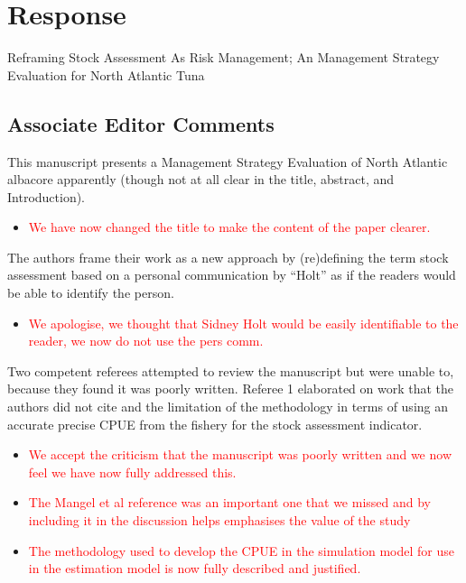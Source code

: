 \documentclass[a4paper,10pt]{article}
\newcommand{\red}{\textcolor{red}}
\begin{document}
\section*{Response}

Reframing Stock Assessment As Risk Management; An Management Strategy Evaluation for North Atlantic Tuna

\subsection*{Associate Editor Comments}

This manuscript presents a Management Strategy Evaluation of North Atlantic albacore apparently (though not at all clear in the title, abstract, and Introduction). 
 \begin{itemize}
    \item  \red{We have now changed the title to make the content of the paper clearer.}
  \end{itemize}

The authors frame their work as a new approach by (re)defining the term stock assessment based on a personal communication by “Holt” as if the readers would be able to identify the person. 
 \begin{itemize}
    \item  \red{We apologise, we thought that Sidney Holt would be easily identifiable to the reader, we now do not use the pers comm.}
  \end{itemize}
 

Two competent referees attempted to review the manuscript but were unable to, because they found it was poorly written. Referee 1 elaborated on work that the authors did not cite and the limitation of the methodology in terms of using an accurate precise CPUE from the fishery for the stock assessment indicator. 
 \begin{itemize}
    \item  \red{We accept the criticism that the manuscript was poorly written and we now feel we have now fully addressed this.}
    
    \item  \red{The Mangel et al reference was an important one that we missed and by including it in the discussion helps emphasises the value of the study}
    
    \item  \red{The methodology used to develop the CPUE in the simulation model for use in the estimation model is now fully described and justified.}
  \end{itemize}
 
\end{document}
